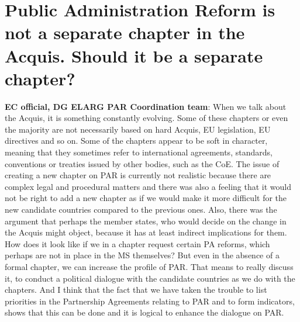 \section{Public Administration Reform is not a separate chapter in the Acquis. Should it be a separate chapter? }
\textbf{EC official, DG ELARG PAR Coordination  team}: When we talk about the Acquis, it is something constantly evolving. Some of these chapters or even the majority are not necessarily based on hard Acquis, EU legislation, EU directives and so on. Some of the chapters appear to be soft in character, meaning that they sometimes refer to international agreements, standards, conventions or treaties issued by other bodies, such as the CoE. The issue of creating a new chapter on PAR is  currently not realistic because there are complex legal and procedural matters and there was also a feeling that it would not be right to add a new chapter as if we would make it more difficult for the new candidate countries compared to the previous ones. Also, there was the argument that perhaps the member states, who would decide on the change in the Acquis might object, because it has at least indirect implications for them. How does it look like if we in a chapter request certain PA reforms, which perhaps are not in place in the MS themselves? But even in the absence of a formal chapter, we can increase the profile of PAR. That means to really discuss it, to conduct a political dialogue with the candidate countries as we do with the chapters. And I think that the fact that we have taken the trouble to list priorities in the Partnership Agreements relating to  PAR and to form indicators, shows that this can be done and it is logical to  enhance the dialogue on PAR.\\
